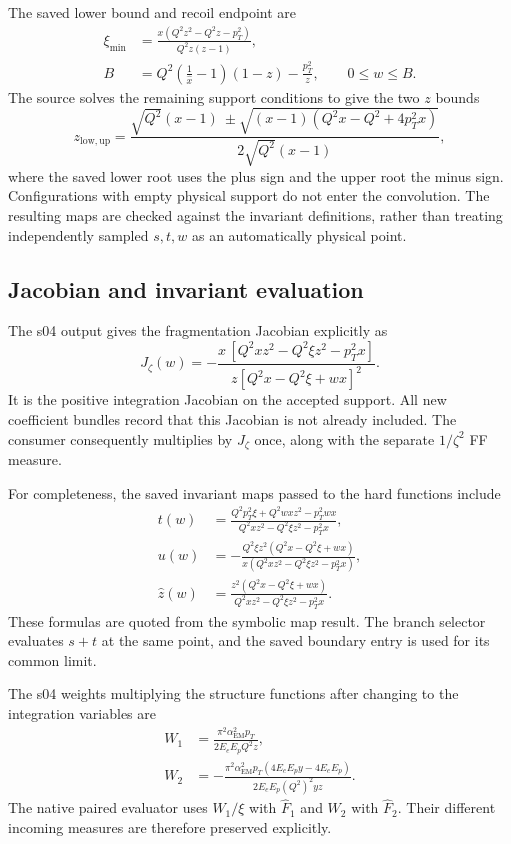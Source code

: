\documentclass[11pt,a4paper]{article}
\newcommand{\Fhat}{\widehat F}
\begin{document}
The saved lower bound and recoil endpoint are
\begin{align}
 \xi_{\min}&=
 \frac{x(Q^2z^2-Q^2z-p_T^2)}{Q^2z(z-1)},\\
 B&=Q^2\left(\frac{1}{\hat x}-1\right)(1-z)-\frac{p_T^2}{z},
 \qquad 0\leq w\leq B.
 \label{eq:numbounds}
\end{align}
The source solves the remaining support conditions to give the two
$z$ bounds
\begin{equation}
 z_{\mathrm{low,up}}=
 \frac{\sqrt{Q^2}(x-1)\ \mathbin{\pm}
 \sqrt{(x-1)(Q^2x-Q^2+4p_T^2x)}}
 {2\sqrt{Q^2}(x-1)},
 \label{eq:zlimits}
\end{equation}
where the saved lower root uses the plus sign and the upper root the
minus sign. Configurations with empty physical support do not enter
the convolution. The resulting maps are checked against the invariant
definitions, rather than treating independently sampled $s,t,w$ as
an automatically physical point.

\subsection{Jacobian and invariant evaluation}

The s04 output gives the fragmentation Jacobian explicitly as
\begin{equation}
 J_\zeta(w)=
 -\frac{x\,[Q^2xz^2-Q^2\xi z^2-p_T^2x]}
 {z[Q^2x-Q^2\xi+wx]^2}.
 \label{eq:zetajacobian}
\end{equation}
It is the positive integration Jacobian on the accepted support. All
new coefficient bundles record that this Jacobian is not already
included. The consumer consequently multiplies by $J_\zeta$ once,
along with the separate $1/\zeta^2$ FF measure.

For completeness, the saved invariant maps passed to the hard functions
include
\begin{align}
 t(w)&=\frac{Q^2p_T^2\xi+Q^2wxz^2-p_T^2wx}
 {Q^2xz^2-Q^2\xi z^2-p_T^2x},\\
 u(w)&=-\frac{Q^2\xi z^2(Q^2x-Q^2\xi+wx)}
 {x(Q^2xz^2-Q^2\xi z^2-p_T^2x)},\\
 \hat z(w)&=\frac{z^2(Q^2x-Q^2\xi+wx)}
 {Q^2xz^2-Q^2\xi z^2-p_T^2x}.
\end{align}
These formulas are quoted from the symbolic map result. The branch
selector evaluates $s+t$ at the same point, and the saved boundary
entry is used for its common limit.

The s04 weights multiplying the structure functions after changing
to the integration variables are
\begin{align}
 W_1&=\frac{\pi^2\alpha_{\mathrm{EM}}^2p_T}
 {2E_eE_pQ^2z},\\
 W_2&=-\frac{\pi^2\alpha_{\mathrm{EM}}^2p_T(4E_eE_py-4E_eE_p)}
 {2E_eE_p(Q^2)^2yz}.
 \label{eq:numweights}
\end{align}
The native paired evaluator uses $W_1/\xi$ with $\Fhat_1$ and
$W_2$ with $\Fhat_2$. Their different incoming measures are therefore
preserved explicitly.
\end{document}
